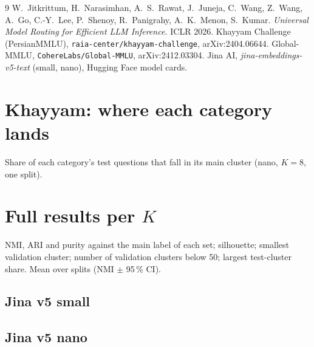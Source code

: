\documentclass[11pt,a4paper]{article}
\begin{document}
\begin{thebibliography}{9}
 W.~Jitkrittum, H.~Narasimhan, A.~S.~Rawat, J.~Juneja, C.~Wang, Z.~Wang, A.~Go, C.-Y.~Lee,
P.~Shenoy, R.~Panigrahy, A.~K.~Menon, S.~Kumar. \emph{Universal Model Routing for Efficient LLM Inference.}
ICLR 2026.
 Khayyam Challenge (PersianMMLU), \texttt{raia-center/khayyam-challenge}, arXiv:2404.06644.
 Global-MMLU, \texttt{CohereLabs/Global-MMLU}, arXiv:2412.03304.
 Jina AI, \emph{jina-embeddings-v5-text} (small, nano), Hugging Face model cards.
\end{thebibliography}

\appendix
\section{Khayyam: where each category lands}\label{app:loyalty}
Share of each category's test questions that fall in its main cluster (nano, $K=8$, one split).
{\small}

\section{Full results per $K$}
NMI, ARI and purity against the main label of each set; silhouette; smallest validation cluster; number of
validation clusters below 50; largest test-cluster share. Mean over splits (NMI $\pm$ 95\,\% CI).

\subsection*{Jina v5 small}
{\small}
\subsection*{Jina v5 nano}
{\small}

\end{document}
